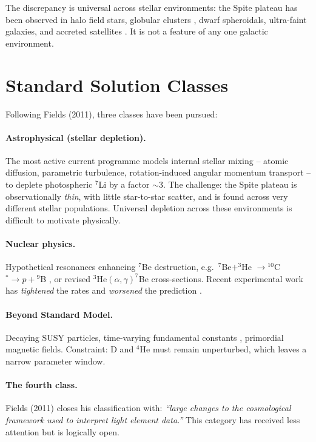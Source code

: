\documentclass[11pt,a4paper]{article}
\begin{document}
The discrepancy is universal across stellar environments: the Spite plateau has been observed in halo field stars, globular clusters \cite{cyburt2008}, dwarf spheroidals, ultra-faint galaxies, and accreted satellites \cite{borisov2024}. It is not a feature of any one galactic environment.

\section{Standard Solution Classes}

Following Fields (2011), three classes have been pursued:

\paragraph{Astrophysical (stellar depletion).}
The most active current programme \cite{borisov2024} models internal stellar mixing -- atomic diffusion, parametric turbulence, rotation-induced angular momentum transport -- to deplete photospheric $^7$Li by a factor $\sim 3$. The challenge: the Spite plateau is observationally \emph{thin}, with little star-to-star scatter, and is found across very different stellar populations. Universal depletion across these environments is difficult to motivate physically.

\paragraph{Nuclear physics.}
Hypothetical resonances enhancing $^7$Be destruction, e.g.\ $^7$Be$ + ^{3}$He $\to {}^{10}$C$^* \to p + {}^{9}$B \cite{fields2011,hammache2013}, or revised $^3$He$(\alpha,\gamma)^7$Be cross-sections. Recent experimental work has \emph{tightened} the rates and \emph{worsened} the prediction \cite{cyburt2008}.

\paragraph{Beyond Standard Model.}
Decaying SUSY particles, time-varying fundamental constants \cite{uzan2003}, primordial magnetic fields. Constraint: D and $^4$He must remain unperturbed, which leaves a narrow parameter window.

\paragraph{The fourth class.}
Fields (2011) closes his classification with: \emph{``large changes to the cosmological framework used to interpret light element data.''} This category has received less attention but is logically open.
\end{document}
